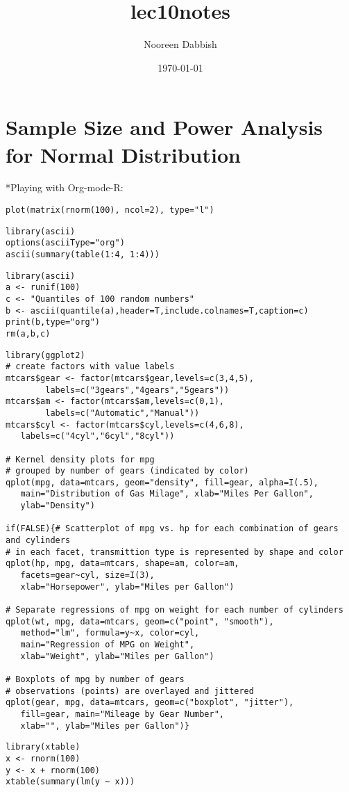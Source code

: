 \documentclass[11pt]{article}
\title{lec10notes}
\author{Nooreen Dabbish}
\date{\today}
\begin{document}
\maketitle

\setcounter{tocdepth}{3}
\tableofcontents
\vspace*{1cm}
\section{Sample Size and Power Analysis for Normal Distribution}
\label{sec-1}



*Playing with Org-mode-R:

\begin{verbatim}
plot(matrix(rnorm(100), ncol=2), type="l")
\end{verbatim}


\begin{verbatim}
library(ascii)
options(asciiType="org")
ascii(summary(table(1:4, 1:4)))
\end{verbatim}


\begin{verbatim}
library(ascii)
a <- runif(100)
c <- "Quantiles of 100 random numbers"
b <- ascii(quantile(a),header=T,include.colnames=T,caption=c)
print(b,type="org")
rm(a,b,c)
\end{verbatim}


\begin{verbatim}
library(ggplot2)
# create factors with value labels 
mtcars$gear <- factor(mtcars$gear,levels=c(3,4,5),
        labels=c("3gears","4gears","5gears")) 
mtcars$am <- factor(mtcars$am,levels=c(0,1),
        labels=c("Automatic","Manual")) 
mtcars$cyl <- factor(mtcars$cyl,levels=c(4,6,8),
   labels=c("4cyl","6cyl","8cyl")) 

# Kernel density plots for mpg
# grouped by number of gears (indicated by color)
qplot(mpg, data=mtcars, geom="density", fill=gear, alpha=I(.5), 
   main="Distribution of Gas Milage", xlab="Miles Per Gallon", 
   ylab="Density")

if(FALSE){# Scatterplot of mpg vs. hp for each combination of gears and cylinders
# in each facet, transmittion type is represented by shape and color
qplot(hp, mpg, data=mtcars, shape=am, color=am, 
   facets=gear~cyl, size=I(3),
   xlab="Horsepower", ylab="Miles per Gallon") 

# Separate regressions of mpg on weight for each number of cylinders
qplot(wt, mpg, data=mtcars, geom=c("point", "smooth"), 
   method="lm", formula=y~x, color=cyl, 
   main="Regression of MPG on Weight", 
   xlab="Weight", ylab="Miles per Gallon")

# Boxplots of mpg by number of gears 
# observations (points) are overlayed and jittered
qplot(gear, mpg, data=mtcars, geom=c("boxplot", "jitter"), 
   fill=gear, main="Mileage by Gear Number",
   xlab="", ylab="Miles per Gallon")}
\end{verbatim}


\begin{verbatim}
library(xtable)
x <- rnorm(100)
y <- x + rnorm(100)
xtable(summary(lm(y ~ x)))
\end{verbatim}
\end{document}
